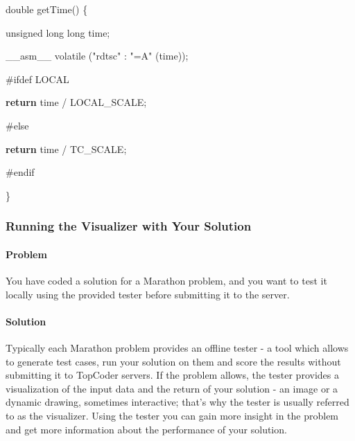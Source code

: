 \documentclass[]{article}
\newenvironment{Shaded}{}{}
\newcommand{\AttributeTok}[1]{\textcolor[rgb]{0.49,0.56,0.16}{#1}}
\newcommand{\ControlFlowTok}[1]{\textcolor[rgb]{0.00,0.44,0.13}{\textbf{#1}}}
\newcommand{\DataTypeTok}[1]{\textcolor[rgb]{0.56,0.13,0.00}{#1}}
\newcommand{\ExtensionTok}[1]{#1}
\newcommand{\NormalTok}[1]{#1}
\newcommand{\PreprocessorTok}[1]{\textcolor[rgb]{0.74,0.48,0.00}{#1}}
\newcommand{\StringTok}[1]{\textcolor[rgb]{0.25,0.44,0.63}{#1}}
\let\oldparagraph\paragraph
\renewcommand{\paragraph}[1]{\oldparagraph{#1}\mbox{}}
\begin{document}
\begin{Shaded}
\begin{Highlighting}[]
\DataTypeTok{double}\NormalTok{ getTime() \{}

   \DataTypeTok{unsigned} \DataTypeTok{long} \DataTypeTok{long}\NormalTok{ time;}

   \ExtensionTok{__asm__} \AttributeTok{volatile}\NormalTok{ (}\StringTok{"rdtsc"}\NormalTok{ : }\StringTok{"=A"}\NormalTok{ (time));}

\PreprocessorTok{#ifdef LOCAL}

   \ControlFlowTok{return}\NormalTok{ time / LOCAL_SCALE;}

\PreprocessorTok{#else}

   \ControlFlowTok{return}\NormalTok{ time / TC_SCALE;}

\PreprocessorTok{#endif}

\NormalTok{\}}
\end{Highlighting}
\end{Shaded}

\hypertarget{running-the-visualizer-with-your-solution}{%
\subsubsection{Running the Visualizer with Your
Solution}\label{running-the-visualizer-with-your-solution}}

\hypertarget{problem-1}{%
\paragraph{Problem}\label{problem-1}}

You have coded a solution for a Marathon problem, and you want to test
it locally using the provided tester before submitting it to the server.

\hypertarget{solution-1}{%
\paragraph{Solution}\label{solution-1}}

Typically each Marathon problem provides an offline tester - a tool
which allows to generate test cases, run your solution on them and score
the results without submitting it to TopCoder servers. If the problem
allows, the tester provides a visualization of the input data and the
return of your solution - an image or a dynamic drawing, sometimes
interactive; that's why the tester is usually referred to as the
visualizer. Using the tester you can gain more insight in the problem
and get more information about the performance of your solution.
\end{document}
